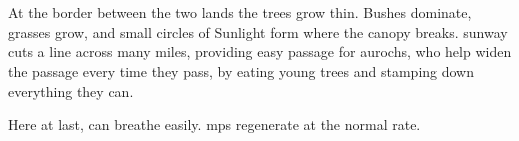 \section{}
\label{sunway}

At the border between the two lands the trees grow thin.
Bushes dominate, grasses grow, and small circles of Sunlight form where the canopy breaks.
\Gls{sunway} cuts a line across many miles, providing easy passage for aurochs, who help widen the passage every time they pass, by eating young trees and stamping down everything they can.

Here at last,  can breathe easily.
\Glspl{mp} regenerate at the normal rate.



